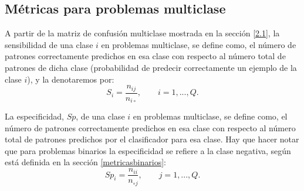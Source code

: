 \subsection{Métricas para problemas multiclase}\label{metricasmulticlase}
\noindent A partir de la matriz de confusión multiclase mostrada en la sección \ref{2.1},
la sensibilidad de una clase $i$ en problemas multiclase, se define como, el número
de patrones correctamente predichos en esa clase con respecto al número total de patrones
de dicha clase (probabilidad de predecir correctamente un ejemplo de la clase $i$), y la
denotaremos por:
\begin{displaymath}
S_{i}=\frac{n_{ij}}{n_{i\circ}}, \qquad i=1,...,Q.
\end{displaymath}

La especificidad, $Sp$, de una clase $i$ en problemas multiclase, se define como, el número
de patrones correctamente predichos en esa clase con respecto al número total de patrones
predichos por el clasificador para esa clase. Hay que hacer notar que para problemas
binarios la
especificidad se refiere a la clase negativa, según está definida en la sección
\ref{metricasbinarios}:
\begin{displaymath}
Sp_{i}=\frac{n_{ii}}{n_{\circ j}}, \qquad j=1,...,Q.
\end{displaymath}

